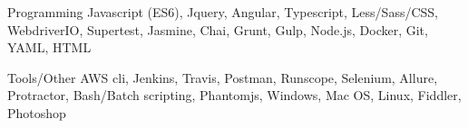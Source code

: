 

\begin{cvskills}

  \cvskill
    {Programming} %
    {Javascript (ES6), Jquery, Angular, Typescript, Less/Sass/CSS, WebdriverIO, Supertest, Jasmine, Chai, Grunt, Gulp, Node.js, Docker, Git, YAML, HTML} %

  \cvskill
    {Tools/Other} %
    {AWS cli, Jenkins, Travis, Postman, Runscope, Selenium, Allure, Protractor, Bash/Batch scripting, Phantomjs, Windows, Mac OS, Linux, Fiddler, Photoshop} %

\end{cvskills}